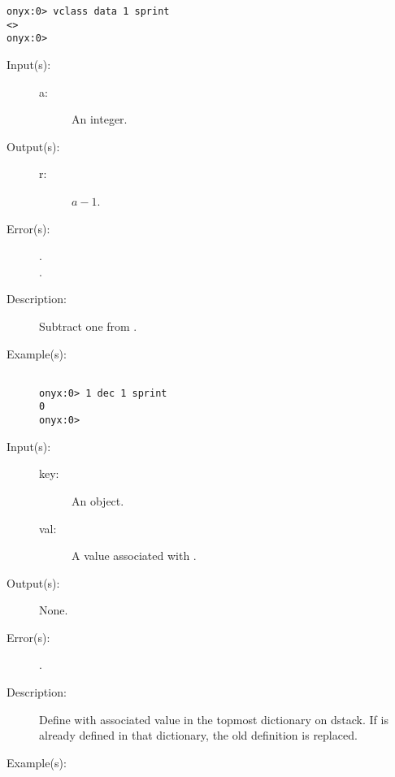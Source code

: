 \begin{description}
\begin{description}
\begin{verbatim}
onyx:0> vclass data 1 sprint
<>
onyx:0>
		\end{verbatim}
	\end{description}
\label{systemdict:dec}
\item[{\onyxop{a}{dec}{r}}: ]
	\begin{description}\item[]
	\item[Input(s): ]
		\begin{description}\item[]
		\item[a: ]
			An integer.
		\end{description}
	\item[Output(s): ]
		\begin{description}\item[]
		\item[r: ]
			$a - 1$.
		\end{description}
	\item[Error(s): ]
		\begin{description}\item[]
		\item[.]
		\item[.]
		\end{description}
	\item[Description: ]
		Subtract one from .
	\item[Example(s): ]\begin{verbatim}

onyx:0> 1 dec 1 sprint
0
onyx:0>
		\end{verbatim}
	\end{description}
\label{systemdict:def}
\item[{\onyxop{key val}{def}{--}}: ]
	\begin{description}\item[]
	\item[Input(s): ]
		\begin{description}\item[]
		\item[key: ]
			An object.
		\item[val: ]
			A value associated with .
		\end{description}
	\item[Output(s): ] None.
	\item[Error(s): ]
		\begin{description}\item[]
		\item[.]
		\end{description}
	\item[Description: ]
		Define  with associated value  in the
		topmost dictionary on dstack.  If  is already defined
		in that dictionary, the old definition is replaced.
	\item[Example(s): ]\begin{verbatim}


\end{verbatim}
\end{description}
\end{description}
